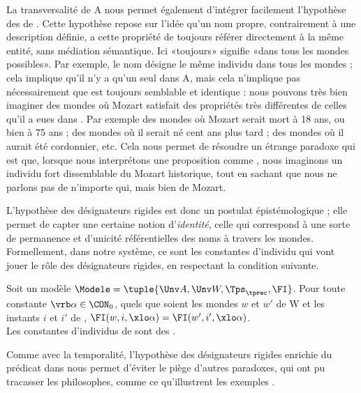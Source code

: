 La transversalité de \Unv A nous permet également d'intégrer facilement l'hypothèse des  de \citet{Kripke:72}.  Cette hypothèse repose sur l'idée qu'un nom propre, contrairement à une description définie, a cette propriété de toujours référer directement à la même entité, sans médiation sémantique.
Ici «toujours» signifie «dans tous les mondes possibles».  Par exemple, le nom  désigne le même individu dans tous les mondes ; cela implique qu'il n'y a qu'un seul  dans {\Unv A}, mais cela n'implique pas nécessairement que  est toujours semblable et identique : nous pouvons très bien imaginer des mondes où Mozart satisfait des propriétés très différentes de celles qu'il a eues dans \wo. Par exemple des mondes où Mozart serait mort à 18 ans, ou bien à 75 ans ; des mondes où il serait né cent ans plus tard ; des mondes où il aurait été cordonnier, etc.  Cela nous permet de résoudre un étrange paradoxe qui est que, lorsque nous interprétons une proposition comme , nous imaginons un individu fort dissemblable du Mozart historique, tout en sachant que nous ne parlons pas de n'importe qui, mais bien de Mozart. 

L'hypothèse des désignateurs rigides est donc un postulat épistémologique ; elle permet de capter une certaine notion d'\emph{identité}, celle qui correspond à une sorte de permanence et d'unicité référentielles des noms à travers les mondes. 
Formellement, dans notre système, ce sont les constantes d'individu qui vont jouer le rôle des désignateurs rigides, en respectant la condition suivante. %

\begin{postu}\label{postu:DR2}
Soit un modèle $\Modele=\tuple{\Unv A,\Unv W,\Tps_{\tprec},\FI}$. Pour toute constante $\vrb\alpha\in\CON_0$, quels que soient les mondes $w$ et $w'$ de \Unv W et les instants $i$ et $i'$ de \Tps, \(\FI(w,i,\xlo\alpha)=\FI(w',i',\xlo\alpha)\).
\\
Les constantes d'individus de {\LO} sont des .
\end{postu}


Comme avec la temporalité, l'hypothèse des désignateurs rigides enrichie du prédicat  dans {\LO} nous permet d'éviter le piège d'autres paradoxes, qui ont pu tracasser les philosophes, comme ce qu'illustrent les exemples \Next. 

